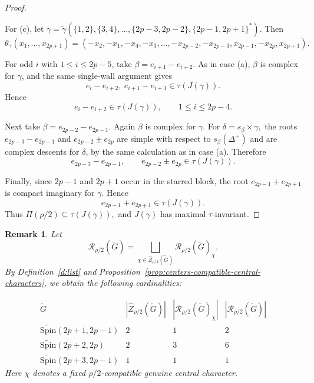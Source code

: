 \documentclass{amsart}
\newcommand{\Spin}{{\mathrm{Spin}}}
\newtheorem{remark}[thm]{Remark}
\theoremstyle{definition}
\newcommand{\tu}{\widetilde}
\begin{document}
\begin{proof}
\begin{itemize}
\end{itemize}


\medskip

For (c), let $\gamma=
\tu\gamma(\{1,2\},\{3,4\},\ldots,
\{2p-3,2p-2\},\{2p-1,2p+1\}^*).$
Then
\[
\theta_\gamma(x_1,\ldots,x_{2p+1})
=
(-x_2,-x_1,-x_4,-x_3,\ldots,
-x_{2p-2},-x_{2p-3},
x_{2p-1},-x_{2p},x_{2p+1}).
\]

For odd \(i\) with \(1\leq i\leq 2p-5\), take
$\beta=e_{i+1}-e_{i+2}.$
As in case (a), \(\beta\) is complex for \(\gamma\), and the same
single-wall argument gives
\[
e_i-e_{i+2},\ e_{i+1}-e_{i+3}
\in\tau(J(\gamma)).
\]
Hence
\[
e_i-e_{i+2}\in\tau(J(\gamma)),
\qquad 1\leq i\leq 2p-4.
\]

Next take
$\beta=e_{2p-2}-e_{2p-1}.$
Again \(\beta\) is complex for \(\gamma\). For
$\delta=s_\beta\times\gamma,$
the roots
$e_{2p-3}-e_{2p-1}$ and
$e_{2p-2}\pm e_{2p}$
are simple with respect to \(s_\beta(\Delta^+)\) and are complex
descents for \(\delta\), by the same calculation as in case (a).
Therefore
\[
e_{2p-3}-e_{2p-1},
\qquad
e_{2p-2}\pm e_{2p}
\in\tau(J(\gamma)).
\]

Finally, since \(2p-1\) and \(2p+1\) occur in the starred block,
the root
$e_{2p-1}+e_{2p+1}$
is compact imaginary for \(\gamma\). Hence
\[
e_{2p-1}+e_{2p+1}\in\tau(J(\gamma)).
\]
Thus
$\Pi(\rho/2)\subseteq\tau(J(\gamma)),$
and \(J(\gamma)\) has maximal \(\tau\)-invariant.
\end{proof}



\begin{remark}\label{r:number}
Let
\begin{equation*}
\mathcal{R}_{\rho/2}(\tu G)
=
\bigsqcup_{\chi\in \widehat Z_{\rho/2}(\tu G)}
\mathcal{R}_{\rho/2}(\tu G)_\chi.
\end{equation*}
By Definition~\ref{d:list} and
Proposition~\ref{prop:centers-compatible-central-characters},
we obtain the following cardinalities:

\begin{equation*}
\begin{array}{c|c|c|c}
\tu G
&
|\widehat Z_{\rho/2}(\tu G)|
&
|\mathcal{R}_{\rho/2}(\tu G)_\chi|
&
|\mathcal{R}_{\rho/2}(\tu G)|
\\
\hline
\tu{\Spin}(2p+1,2p-1)
& 2 & 1 & 2
\\
\tu{\Spin}(2p+2,2p)
& 2 & 3 & 6
\\
\tu{\Spin}(2p+3,2p-1)
& 1 & 1 & 1
\end{array}
\end{equation*}
Here $\chi$ denotes a fixed $\rho/2$-compatible genuine central character.
\end{remark}
\end{document}
